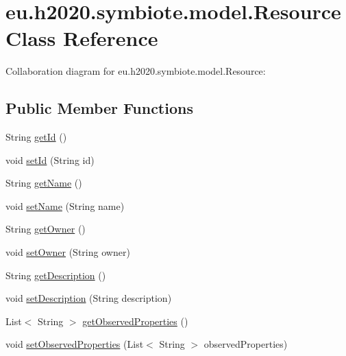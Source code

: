 \hypertarget{classeu_1_1h2020_1_1symbiote_1_1model_1_1Resource}{}\section{eu.\+h2020.\+symbiote.\+model.\+Resource Class Reference}
\label{classeu_1_1h2020_1_1symbiote_1_1model_1_1Resource}


Collaboration diagram for eu.\+h2020.\+symbiote.\+model.\+Resource\+:
\subsection*{Public Member Functions}
\begin{DoxyCompactItemize}
\item 
String \hyperlink{classeu_1_1h2020_1_1symbiote_1_1model_1_1Resource_a6d2b00f0e94b55cce1daff002012369c}{get\+Id} ()
\item 
void \hyperlink{classeu_1_1h2020_1_1symbiote_1_1model_1_1Resource_a209815ba7cdb6b82334e664eb4c38708}{set\+Id} (String id)
\item 
String \hyperlink{classeu_1_1h2020_1_1symbiote_1_1model_1_1Resource_a7332986d4dfa4ca233f705659f166f2c}{get\+Name} ()
\item 
void \hyperlink{classeu_1_1h2020_1_1symbiote_1_1model_1_1Resource_ad2cd06bcbfa928adead9017509cc2e78}{set\+Name} (String name)
\item 
String \hyperlink{classeu_1_1h2020_1_1symbiote_1_1model_1_1Resource_a0bd495e4c9a10fac6e885de268b5ad76}{get\+Owner} ()
\item 
void \hyperlink{classeu_1_1h2020_1_1symbiote_1_1model_1_1Resource_a4391365a9ef765fb9c96e8243a45fafb}{set\+Owner} (String owner)
\item 
String \hyperlink{classeu_1_1h2020_1_1symbiote_1_1model_1_1Resource_ae2ce583e094c18bca236027602739049}{get\+Description} ()
\item 
void \hyperlink{classeu_1_1h2020_1_1symbiote_1_1model_1_1Resource_a19349909b51f43be943fcc3ebc078009}{set\+Description} (String description)
\item 
List$<$ String $>$ \hyperlink{classeu_1_1h2020_1_1symbiote_1_1model_1_1Resource_a2aaf59e1be5b0c974a31e106adfa6c43}{get\+Observed\+Properties} ()
\item 
void \hyperlink{classeu_1_1h2020_1_1symbiote_1_1model_1_1Resource_a826dbee60cf539ffbf1a088496ac7e11}{set\+Observed\+Properties} (List$<$ String $>$ observed\+Properties)

\end{DoxyCompactItemize}
